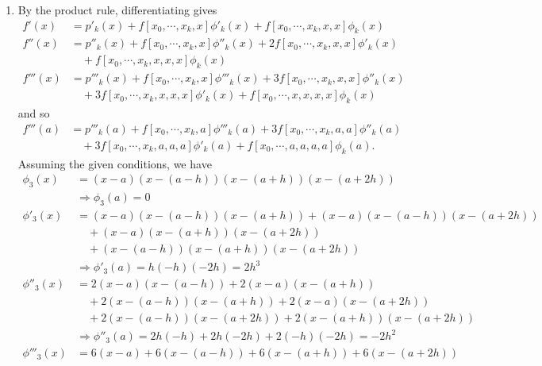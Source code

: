 \documentclass[a4paper,12pt]{article}
\begin{document}
\begin{enumerate}
    \item
        By the product rule, differentiating gives
        \begin{align*}
            f'(x) &= p'_k(x) + f[x_0, \cdots, x_k, x] \phi'_k(x) + f[x_0, \cdots, x_k, x, x] \phi_k(x) \\
            f''(x) &= p''_k(x) + f[x_0, \cdots, x_k, x] \phi''_k(x) + 2f[x_0, \cdots, x_k, x, x] \phi'_k(x) \\
            &\quad+ f[x_0, \cdots, x_k, x, x, x] \phi_k(x) \\
            f'''(x) &= p'''_k(x) + f[x_0, \cdots, x_k, x] \phi'''_k(x) + 3f[x_0, \cdots, x_k, x, x] \phi''_k(x) \\
            &\quad+ 3f[x_0, \cdots, x_k, x, x, x] \phi'_k(x) + f[x_0, \cdots, x, x, x, x] \phi_k(x)
        \end{align*}
        and so
        \begin{align*}
            f'''(a) &= p'''_k(a) + f[x_0, \cdots, x_k, a] \phi'''_k(a) + 3f[x_0, \cdots, x_k, a, a] \phi''_k(a) \\
            &\quad+ 3f[x_0, \cdots, x_k, a, a, a] \phi'_k(a) + f[x_0, \cdots, a, a, a, a] \phi_k(a).
        \end{align*}
        Assuming the given conditions, we have
        \begin{align*}
            \phi_3(x) &= (x - a)(x - (a - h))(x - (a + h))(x - (a + 2h)) \\
            &\Rightarrow \phi_3(a) = 0 \\
            \phi'_3(x) &= (x - a)(x - (a - h))(x - (a + h)) + (x - a)(x - (a - h))(x - (a + 2h)) \\
            &\quad+ (x - a)(x - (a + h))(x - (a + 2h)) \\
            &\quad+ (x - (a - h))(x - (a + h))(x - (a + 2h)) \\
            &\Rightarrow \phi'_3(a) = h(-h)(-2h) = 2h^3 \\
            \phi''_3(x) &= 2(x - a)(x - (a - h)) + 2(x - a)(x - (a + h)) \\
            &\quad+ 2(x - (a - h))(x - (a + h)) + 2(x - a)(x - (a + 2h)) \\
            &\quad+ 2(x - (a - h))(x - (a + 2h)) + 2(x - (a + h))(x - (a + 2h)) \\
            &\Rightarrow \phi''_3(a) = 2h(-h) + 2h(-2h) + 2(-h)(-2h) = -2h^2 \\
            \phi'''_3(x) &= 6(x - a) + 6(x - (a - h)) + 6(x - (a + h)) + 6(x - (a + 2h)) \\

\end{align*}
\end{enumerate}
\end{document}
